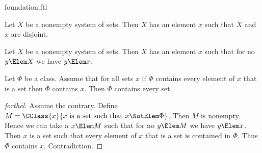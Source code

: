 \documentclass{stex}
\begin{document}
\begin{smodule}{foundation.ftl}


\begin{axiom}[forthel,title=Foundation,name=Foundation Axiom]
  Let $X$ be a nonempty system of sets.
  Then $X$ has an element $x$ such that $X$ and $x$ are disjoint.
\end{axiom}

\begin{corollary}[forthel,name=wellfoundedness of membership relation]
  Let $X$ be a nonempty system of sets.
  Then $X$ has an element $x$ such that for no $y \Elem X$ we have $y \Elem x$.
\end{corollary}

\begin{proposition}[forthel,name=epsilon induction]
  Let $\Phi$ be a class.
  Assume that for all sets $x$ if $\Phi$ contains every element of $x$ that is a set then $\Phi$ contains $x$.
  Then $\Phi$ contains every set.
\end{proposition}
\begin{proof}[forthel]
  Assume the contrary.
  Define $M = \CClass{x}{x\text{ is a set such that }x \NotElem \Phi}$.
  Then $M$ is nonempty.
  Hence we can take a $x \Elem M$ such that for no $y \Elem M$ we have $y \Elem x$.
  Then $x$ is a set such that every element of $x$ that is a set is contained in $\Phi$.
  Thus $\Phi$ contains $x$.
  Contradiction.
\end{proof}
\end{smodule}
\end{document}
